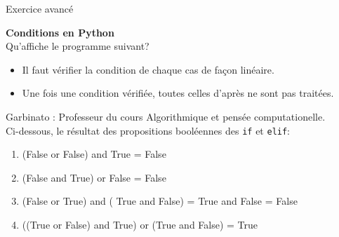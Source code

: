 Exercice avancé 
\begin{Exercice}[5 minutes] \textbf{Conditions en Python}\\
  Qu'affiche le programme suivant?
  
   
    \begin{conseil}
      	\begin{itemize}
      		\item Il faut vérifier la condition de chaque cas de façon linéaire.
      		\item Une fois une condition vérifiée, toutes celles d'après ne sont pas traitées.
      	\end{itemize}
        
    \end{conseil}
    \begin{solution}
    
    Garbinato : Professeur du cours Algorithmique et pensée computationelle. \\
    
    Ci-dessous, le résultat des propositions booléennes des \lstinline{if} et \lstinline{elif}: \\
    
    \begin{enumerate}
    	\item (False or False) and True = False
    	\item (False and True) or False = False
    	\item (False or True) and ( True and False) = True and False = False
    	\item ((True or False) and True) or (True and False) = True
    \end{enumerate}
           
    \end{solution}   
\end{Exercice}

